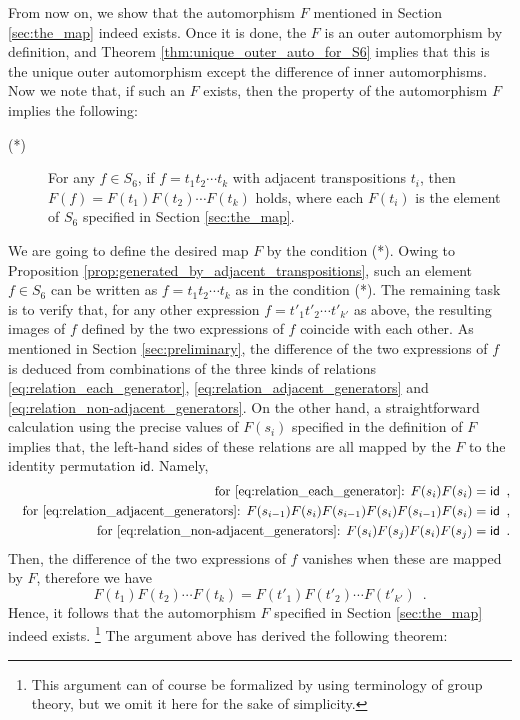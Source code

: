 \documentclass[11pt]{article}
\begin{document}
From now on, we show that the automorphism $F$ mentioned in Section \ref{sec:the_map} indeed exists.
Once it is done, the $F$ is an outer automorphism by definition, and Theorem \ref{thm:unique_outer_auto_for_S6} implies that this is the unique outer automorphism except the difference of inner automorphisms.
Now we note that, if such an $F$ exists, then the property of the automorphism $F$ implies the following:
\begin{description}
\item[(*)]
For any $f \in S_6$, if $f = t_1 t_2 \cdots t_k$ with adjacent transpositions $t_i$, then $F(f) = F(t_1)F(t_2) \cdots F(t_k)$ holds, where each $F(t_i)$ is the element of $S_6$ specified in Section \ref{sec:the_map}.
\end{description}
We are going to define the desired map $F$ by the condition (*).
Owing to Proposition \ref{prop:generated_by_adjacent_transpositions}, such an element $f \in S_6$ can be written as $f = t_1 t_2 \cdots t_k$ as in the condition (*).
The remaining task is to verify that, for any other expression $f = t'_1 t'_2 \cdots t'_{k'}$ as above, the resulting images of $f$ defined by the two expressions of $f$ coincide with each other.
As mentioned in Section \ref{sec:preliminary}, the difference of the two expressions of $f$ is deduced from combinations of the three kinds of relations \eqref{eq:relation_each_generator}, \eqref{eq:relation_adjacent_generators} and \eqref{eq:relation_non-adjacent_generators}.
On the other hand, a straightforward calculation using the precise values of $F(s_i)$ specified in the definition of $F$ implies that, the left-hand sides of these relations are all mapped by the $F$ to the identity permutation $\mathsf{id}$.
Namely,
\begin{eqnarray*}
&&\mbox{for \eqref{eq:relation_each_generator}: } F(s_i)F(s_i) = \mathsf{id} \enspace, \\
&&\mbox{for \eqref{eq:relation_adjacent_generators}: } F(s_{i-1})F(s_i)F(s_{i-1})F(s_i)F(s_{i-1})F(s_i) = \mathsf{id} \enspace, \\
&&\mbox{for \eqref{eq:relation_non-adjacent_generators}: } F(s_i)F(s_j)F(s_i)F(s_j) = \mathsf{id} \enspace.
\end{eqnarray*}
Then, the difference of the two expressions of $f$ vanishes when these are mapped by $F$, therefore we have
\begin{displaymath}
F(t_1)F(t_2) \cdots F(t_k) = F(t'_1) F(t'_2) \cdots F(t'_{k'}) \enspace.
\end{displaymath}
Hence, it follows that the automorphism $F$ specified in Section \ref{sec:the_map} indeed exists.%
\footnote{This argument can of course be formalized by using terminology of group theory, but we omit it here for the sake of simplicity.}
The argument above has derived the following theorem:
\end{document}
